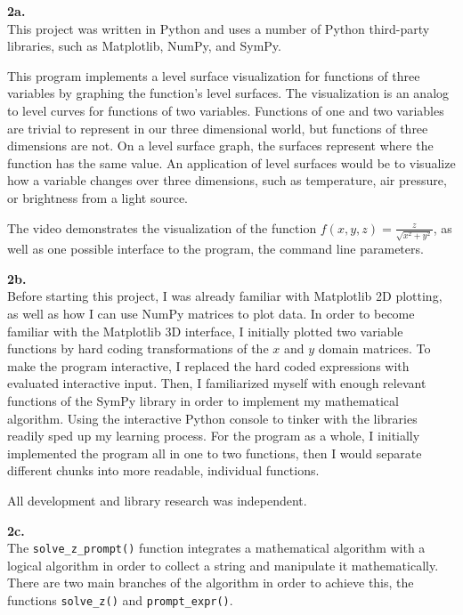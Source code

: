 \documentclass[11pt]{article}
\newcommand{\double}[0]{\par\null\par}
\renewcommand{\section}[1]{\textbf{#1}\\}
\newcommand{\paren}[1]{\left({#1}\right)}
\begin{document}
\selectfont
\section{2a.}
This project was written in Python and uses a number of Python third-party libraries, such as Matplotlib, NumPy, and
SymPy.\double

This program implements a level surface visualization for functions of three variables by graphing the function's level
surfaces. The visualization is an analog to level curves for functions of two variables. Functions of one and two variables
are trivial to represent in our three dimensional world, but functions of three dimensions are not. On a level surface graph,
the surfaces represent where the function has the same value. An application of level surfaces would be to visualize how a
variable changes over three dimensions, such as temperature, air pressure, or brightness from a light source.\double
The video demonstrates the visualization of the function $f\paren{x,y,z}=\frac{z}{\sqrt{x^2+y^2}}$, as well as one possible interface
to the program, the command line parameters.\double

\section{2b.}
Before starting this project, I was already familiar with Matplotlib 2D plotting, as well as how I can use NumPy matrices to
plot data. In order to become familiar with the Matplotlib 3D interface, I initially plotted two variable functions by hard
coding transformations of the $x$ and $y$ domain matrices. To make the program interactive, I replaced the hard coded
expressions with evaluated interactive input. Then, I familiarized myself with enough relevant functions of the SymPy library
in order to implement my mathematical algorithm. Using the interactive Python console to tinker with the libraries readily
sped up my learning process. For the program as a whole, I initially implemented the program all in one to two functions,
then I would separate different chunks into more readable, individual functions.\double

All development and library research was independent.\double

\section{2c.}
The \verb|solve_z_prompt()| function integrates a mathematical algorithm with a logical algorithm in order to collect a string
and manipulate it mathematically. There are two main branches of the algorithm in order to achieve this, the functions \verb|solve_z()|
and \verb|prompt_expr()|.\double
\end{document}

